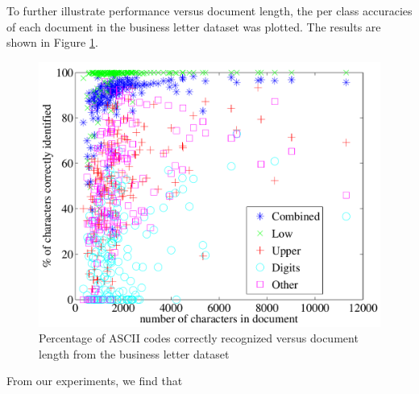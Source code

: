 \documentclass[times, 10pt,twocolumn]{article}
\begin{document}
To further illustrate performance versus document length, the per class
accuracies of each document in the business letter dataset was plotted.  The
results are shown in Figure \ref{acc_v_doclen_fig}.

\begin{figure}[ht]
  \centering
  \includegraphics[scale=.5]{figures/acc_v_doclen}
  \caption{Percentage of ASCII codes correctly recognized versus document
  length from the business letter dataset}
  \label{acc_v_doclen_fig}
\end{figure}



From our experiments, we find that 
%
%
%
%  



\end{document}
